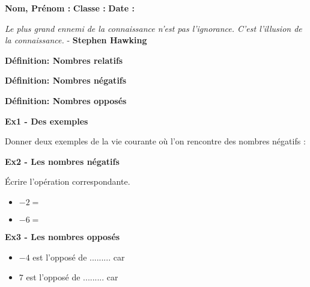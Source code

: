 



\textbf{Nom, Prénom :} \hspace{8cm} \textbf{Classe :} \hspace{3cm} \textbf{Date :}\\

\begin{center}
  \textit{Le plus grand ennemi de la connaissance n'est pas l'ignorance. C'est l'illusion de la connaissance.} - \textbf{Stephen Hawking}
\end{center}

\textbf{Définition: Nombres relatifs} \\ \Pointilles[3]


\textbf{Définition: Nombres négatifs} \\ \Pointilles[3]

\textbf{Définition: Nombres opposés} \\ \Pointilles[3]

\textbf{Ex1 - Des exemples}

Donner deux exemples de la vie courante où l'on rencontre des nombres négatifs : \\ \Pointilles[1]


\textbf{Ex2 - Les nombres négatifs}

Écrire l'opération correspondante.

\begin{multicols}{2}
\begin{itemize}[label={$\bullet$}]
  \item $-2 =$ \dotfill
  \item $-6 =$ \dotfill
\end{itemize} 
\end{multicols}

\textbf{Ex3 - Les nombres opposés}

\begin{multicols}{2}
\begin{itemize}[label={$\bullet$}]
  \item $-4$ est l'opposé de ......... car \dotfill
  \item $ 7$ est l'opposé de ......... car \dotfill
\end{itemize} 
\end{multicols}



